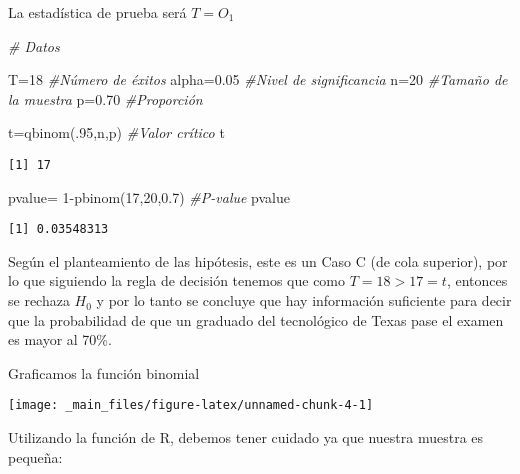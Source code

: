 \documentclass[
  a4paper,
  oneside,
  openany]{book}
\newenvironment{Shaded}{\begin{snugshade}}{\end{snugshade}}
\newcommand{\CommentTok}[1]{\textcolor[rgb]{0.56,0.35,0.01}{\textit{#1}}}
\newcommand{\DecValTok}[1]{\textcolor[rgb]{0.00,0.00,0.81}{#1}}
\newcommand{\FloatTok}[1]{\textcolor[rgb]{0.00,0.00,0.81}{#1}}
\newcommand{\FunctionTok}[1]{\textcolor[rgb]{0.00,0.00,0.00}{#1}}
\newcommand{\NormalTok}[1]{#1}
\newcommand{\OtherTok}[1]{\textcolor[rgb]{0.56,0.35,0.01}{#1}}
\newcommand{\SpecialCharTok}[1]{\textcolor[rgb]{0.00,0.00,0.00}{#1}}
\begin{document}
La estadística de prueba será \(T=O_1\)

\begin{Shaded}
\begin{Highlighting}[]
\CommentTok{\# Datos}

\NormalTok{T}\OtherTok{=}\DecValTok{18}                                   \CommentTok{\#Número de éxitos}
\NormalTok{alpha}\OtherTok{=}\FloatTok{0.05}                             \CommentTok{\#Nivel de significancia}
\NormalTok{n}\OtherTok{=}\DecValTok{20}                                   \CommentTok{\#Tamaño de la muestra}
\NormalTok{p}\OtherTok{=}\FloatTok{0.70}                                 \CommentTok{\#Proporción  }

\NormalTok{t}\OtherTok{=}\FunctionTok{qbinom}\NormalTok{(.}\DecValTok{95}\NormalTok{,n,p)                       }\CommentTok{\#Valor crítico}
\NormalTok{t}
\end{Highlighting}
\end{Shaded}

\begin{verbatim}
[1] 17
\end{verbatim}

\begin{Shaded}
\begin{Highlighting}[]
\NormalTok{pvalue}\OtherTok{=} \DecValTok{1}\SpecialCharTok{{-}}\FunctionTok{pbinom}\NormalTok{(}\DecValTok{17}\NormalTok{,}\DecValTok{20}\NormalTok{,}\FloatTok{0.7}\NormalTok{)                }\CommentTok{\#P{-}value}
\NormalTok{pvalue}
\end{Highlighting}
\end{Shaded}

\begin{verbatim}
[1] 0.03548313
\end{verbatim}

Según el planteamiento de las hipótesis, este es un Caso C (de cola superior), por lo que siguiendo la regla de decisión tenemos que como \(T=18>17=t\), entonces se rechaza \(H_0\) y por lo tanto se concluye que hay información suficiente para decir que la probabilidad de que un graduado del tecnológico de Texas pase el examen es mayor al 70\%.

Graficamos la función binomial

\begin{center}\texttt{[image: \_main\_files/figure-latex/unnamed-chunk-4-1]} \end{center}

Utilizando la función de R, debemos tener cuidado ya que nuestra muestra es pequeña:
\end{document}
